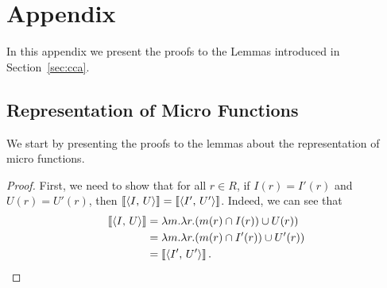 \section*{Appendix}
In this appendix we present the proofs to the Lemmas introduced in Section~\ref{sec:cca}.

\subsection*{Representation of Micro Functions}
We start by presenting the proofs to the lemmas about the representation of micro functions.

\equalEq*
\begin{proof}
   First, we need to show that for all $r\in R$, if $I(r)=I'(r)$ and $U(r)=U'(r)$, then $\left\llbracket\left\langle I,\,U\right\rangle\right\rrbracket=\left\llbracket\left\langle I',\,U'\right\rangle\right\rrbracket$. Indeed, we can see that
    \begin{align*}
        \left\llbracket\left\langle I,\,U\right\rangle\right\rrbracket
       & = \lambda m. \lambda r. (m(r) \cap I(r))\cup U(r))\\
       & = \lambda m. \lambda r. (m(r) \cap I'(r))\cup U'(r))\\
       & = 
        \left\llbracket\left\langle I',\,U'\right\rangle\right\rrbracket.
    \end{align*}


\end{proof}
